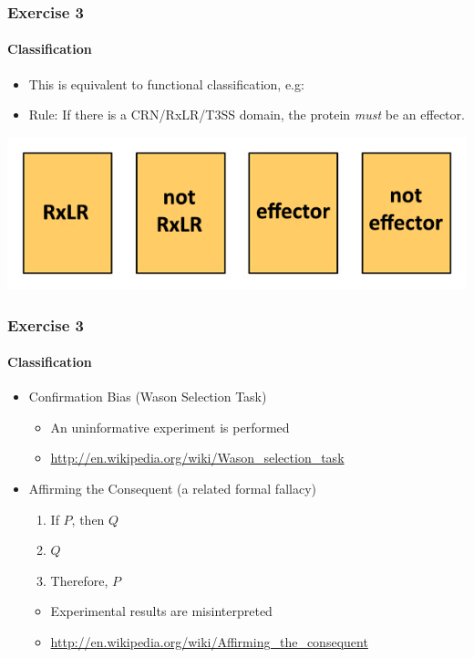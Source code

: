 \begin{frame}
  \frametitle{Exercise 3}
  \framesubtitle{Classification}
  \begin{itemize}
    \item This is equivalent to functional classification, e.g:
    \item Rule: If there is a CRN/RxLR/T3SS domain, the protein \textit{must} be an effector.
  \end{itemize}
  \includegraphics[width=\textwidth]{images/wason_rxlr}
\end{frame}
  
\begin{frame}
  \frametitle{Exercise 3}
  \framesubtitle{Classification}
  \begin{itemize}
    \item Confirmation Bias (Wason Selection Task)
    \begin{itemize}
      \item An uninformative experiment is performed
      \item \url{http://en.wikipedia.org/wiki/Wason_selection_task}
    \end{itemize}
    \item Affirming the Consequent (a related formal fallacy)
    \begin{enumerate}
     \item If $P$, then $Q$
     \item $Q$
     \item Therefore, $P$
    \end{enumerate}
    \begin{itemize}
      \item Experimental results are misinterpreted
      \item \url{http://en.wikipedia.org/wiki/Affirming_the_consequent}
    \end{itemize}
  \end{itemize}
\end{frame}
